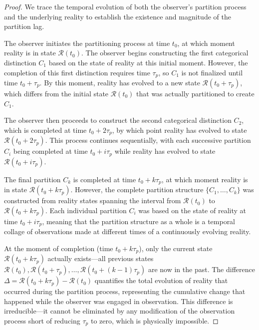 \documentclass[12pt,a4paper]{article}
\theoremstyle{definition}
\theoremstyle{remark}
\begin{document}
\begin{proof}
We trace the temporal evolution of both the observer's partition process and the underlying reality to establish the existence and magnitude of the partition lag.

The observer initiates the partitioning process at time $t_0$, at which moment reality is in state $\mathcal{R}(t_0)$. The observer begins constructing the first categorical distinction $C_1$ based on the state of reality at this initial moment. However, the completion of this first distinction requires time $\tau_p$, so $C_1$ is not finalized until time $t_0 + \tau_p$. By this moment, reality has evolved to a new state $\mathcal{R}(t_0 + \tau_p)$, which differs from the initial state $\mathcal{R}(t_0)$ that was actually partitioned to create $C_1$.

The observer then proceeds to construct the second categorical distinction $C_2$, which is completed at time $t_0 + 2\tau_p$, by which point reality has evolved to state $\mathcal{R}(t_0 + 2\tau_p)$. This process continues sequentially, with each successive partition $C_i$ being completed at time $t_0 + i\tau_p$ while reality has evolved to state $\mathcal{R}(t_0 + i\tau_p)$.

The final partition $C_k$ is completed at time $t_0 + k\tau_p$, at which moment reality is in state $\mathcal{R}(t_0 + k\tau_p)$. However, the complete partition structure $\{C_1, \ldots, C_k\}$ was constructed from reality states spanning the interval from $\mathcal{R}(t_0)$ to $\mathcal{R}(t_0 + k\tau_p)$. Each individual partition $C_i$ was based on the state of reality at time $t_0 + i\tau_p$, meaning that the partition structure as a whole is a temporal collage of observations made at different times of a continuously evolving reality.

At the moment of completion (time $t_0 + k\tau_p$), only the current state $\mathcal{R}(t_0 + k\tau_p)$ actually exists—all previous states $\mathcal{R}(t_0), \mathcal{R}(t_0 + \tau_p), \ldots, \mathcal{R}(t_0 + (k-1)\tau_p)$ are now in the past. The difference $\Delta = \mathcal{R}(t_0 + k\tau_p) - \mathcal{R}(t_0)$ quantifies the total evolution of reality that occurred during the partition process, representing the cumulative change that happened while the observer was engaged in observation. This difference is irreducible—it cannot be eliminated by any modification of the observation process short of reducing $\tau_p$ to zero, which is physically impossible.
\end{proof}
\end{document}

